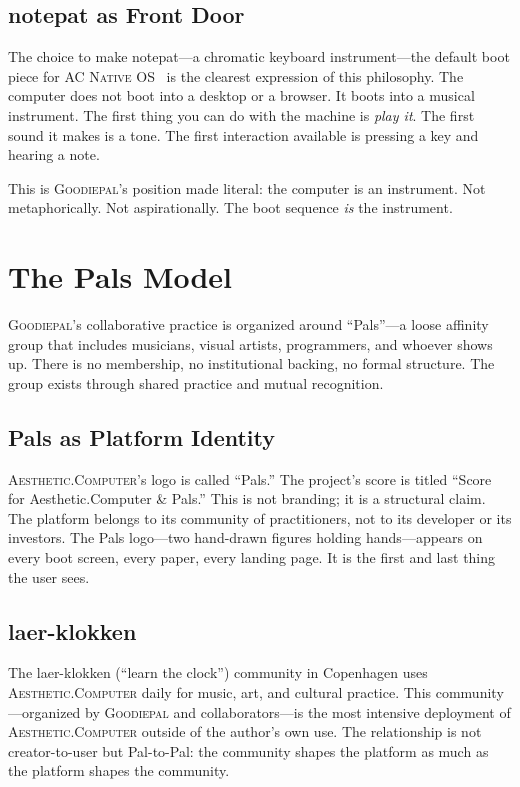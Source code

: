 \documentclass[10pt,letterpaper,twocolumn]{article}
\newcommand{\ac}{\textsc{Aesthetic.Computer}}
\newcommand{\acos}{\textsc{AC Native OS}}
\newcommand{\gp}{\textsc{Goodiepal}}
\begin{document}
\subsection{notepat as Front Door}

The choice to make notepat---a chromatic keyboard instrument---the default boot piece for \acos{}~\citep{scudder2026notepat} is the clearest expression of this philosophy. The computer does not boot into a desktop or a browser. It boots into a musical instrument. The first thing you can do with the machine is \emph{play it}. The first sound it makes is a tone. The first interaction available is pressing a key and hearing a note.

This is \gp{}'s position made literal: the computer is an instrument. Not metaphorically. Not aspirationally. The boot sequence \emph{is} the instrument.

\section{The Pals Model}

\gp{}'s collaborative practice is organized around ``Pals''---a loose affinity group that includes musicians, visual artists, programmers, and whoever shows up. There is no membership, no institutional backing, no formal structure. The group exists through shared practice and mutual recognition.

\subsection{Pals as Platform Identity}

\ac{}'s logo is called ``Pals.'' The project's score is titled ``Score for Aesthetic.Computer \& Pals.'' This is not branding; it is a structural claim. The platform belongs to its community of practitioners, not to its developer or its investors. The Pals logo---two hand-drawn figures holding hands---appears on every boot screen, every paper, every landing page. It is the first and last thing the user sees.

\subsection{laer-klokken}

The laer-klokken (``learn the clock'') community in Copenhagen uses \ac{} daily for music, art, and cultural practice. This community---organized by \gp{} and collaborators---is the most intensive deployment of \ac{} outside of the author's own use. The relationship is not creator-to-user but Pal-to-Pal: the community shapes the platform as much as the platform shapes the community.
\end{document}
